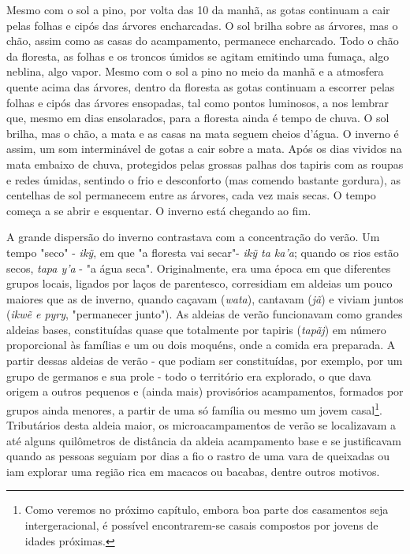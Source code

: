 Mesmo com o sol a pino, por volta das 10 da manhã, as gotas continuam a
cair pelas folhas e cipós das árvores encharcadas. O sol brilha sobre as
árvores, mas o chão, assim como as casas do acampamento, permanece
encharcado. Todo o chão da floresta, as folhas e os troncos úmidos se
agitam emitindo uma fumaça, algo neblina, algo vapor. Mesmo com o sol a
pino no meio da manhã e a atmosfera quente acima das árvores, dentro da
floresta as gotas continuam a escorrer pelas folhas e cipós das árvores
ensopadas, tal como pontos luminosos, a nos lembrar que, mesmo em dias
ensolarados, para a floresta ainda é tempo de chuva. O sol brilha, mas o
chão, a mata e as casas na mata seguem cheios d'água. O inverno é assim,
um som interminável de gotas a cair sobre a mata. Após os dias vividos
na mata embaixo de chuva, protegidos pelas grossas palhas dos tapiris
com as roupas e redes úmidas, sentindo o frio e desconforto (mas comendo
bastante gordura), as centelhas de sol permanecem entre as árvores, cada
vez mais secas. O tempo começa a se abrir e esquentar. O inverno está
chegando ao fim.

A grande dispersão do inverno contrastava com a concentração do verão.
Um tempo "seco" - \emph{ikỹ}, em que "a floresta vai secar"- \emph{ikỹ
ta ka'a}; quando os rios estão secos, \emph{tapa y'a} - "a água seca".
Originalmente, era uma época em que diferentes grupos locais, ligados
por laços de parentesco, corresidiam em aldeias um pouco maiores que as
de inverno, quando caçavam (\emph{wata}), cantavam (\emph{jã}) e viviam
juntos (\emph{ikwẽ e pyry}, "permanecer junto"). As aldeias de verão
funcionavam como grandes aldeias bases, constituídas quase que
totalmente por tapiris (\emph{tapãj}) em número proporcional às famílias
e um ou dois moquéns, onde a comida era preparada. A partir dessas
aldeias de verão - que podiam ser constituídas, por exemplo, por um
grupo de germanos e sua prole - todo o território era explorado, o que
dava origem a outros pequenos e (ainda mais) provisórios acampamentos,
formados por grupos ainda menores, a partir de uma só família ou mesmo
um jovem casal\footnote{Como veremos no próximo capítulo, embora boa
  parte dos casamentos seja intergeracional, é possível encontrarem-se
  casais compostos por jovens de idades próximas.}. Tributários desta
aldeia maior, os microacampamentos de verão se localizavam a até alguns
quilômetros de distância da aldeia acampamento base e se justificavam
quando as pessoas seguiam por dias a fio o rastro de uma vara de
queixadas ou iam explorar uma região rica em macacos ou bacabas, dentre
outros motivos.


